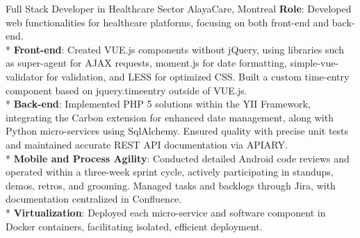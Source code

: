 \documentclass[
  a4paper,
   maincolor=cvblue,
   sectioncolor=cvblue,
]{fortysecondscv}
\begin{document}
\begin{cvtable}
    {Full Stack Developer in Healthcare Sector}
    {AlayaCare, Montreal}
    {
      \textbf{Role}: Developed web functionalities for healthcare platforms, focusing on both front-end and back-end.\\
      * \textbf{Front-end}: Created VUE.js components without jQuery, using libraries such as super-agent for AJAX requests, moment.js for date formatting, simple-vue-validator for validation, and LESS for optimized CSS. Built a custom time-entry component based on jquery.timeentry outside of VUE.js.\\
      * \textbf{Back-end}: Implemented PHP 5 solutions within the YII Framework, integrating the Carbon extension for enhanced date management, along with Python micro-services using SqlAlchemy. Ensured quality with precise unit tests and maintained accurate REST API documentation via APIARY.\\
      * \textbf{Mobile and Process Agility}: Conducted detailed Android code reviews and operated within a three-week sprint cycle, actively participating in standups, demos, retros, and grooming. Managed tasks and backlogs through Jira, with documentation centralized in Confluence.\\
      * \textbf{Virtualization}: Deployed each micro-service and software component in Docker containers, facilitating isolated, efficient deployment.\\
    }
\end{cvtable}
\end{document}
